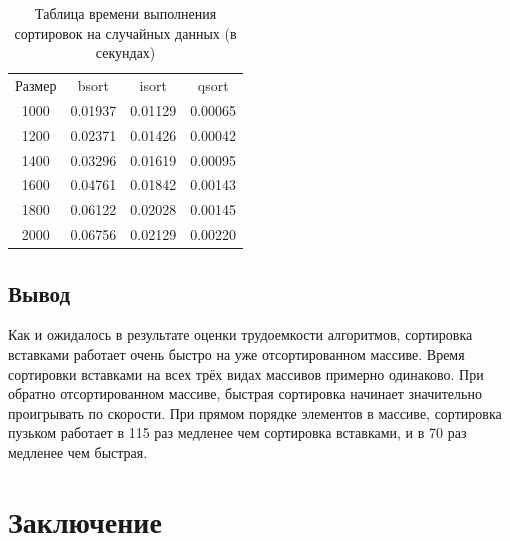 \documentclass[12pt]{report}
\begin{document}
\begin{table} [h!]
	\caption{Таблица времени выполнения сортировок на случайных данных (в секундах)}
	\begin{center}
	\begin{tabular}{|c c c c|}

		\hline

		Размер & bsort & isort  & qsort \\ [0.5ex]

		1000 & 0.01937 & 0.01129 & 0.00065 \\ 

		\hline 

		1200 & 0.02371 & 0.01426 & 0.00042 \\ 

		\hline 

		1400 & 0.03296 & 0.01619 & 0.00095 \\ 

		\hline 

		1600 & 0.04761 & 0.01842 & 0.00143 \\ 

		\hline 

		1800 & 0.06122 & 0.02028 & 0.00145 \\ 

		\hline 

		2000 & 0.06756 & 0.02129 & 0.00220 \\ 

		\hline 

	\end{tabular}
	\end{center}
\end{table}

\section{Вывод}

Как и ожидалось в результате оценки трудоемкости алгоритмов, сортировка вставками работает очень быстро на уже отсортированном массиве. Время сортировки вставками на всех трёх видах массивов примерно одинаково.
При обратно отсортированном массиве, быстрая сортировка начинает значительно проигрывать по скорости.
При прямом порядке элементов в массиве, сортировка пузьком работает в 115 раз медленее чем сортировка вставками, и в 70 раз медленее чем быстрая.


\chapter*{Заключение}
\end{document}
